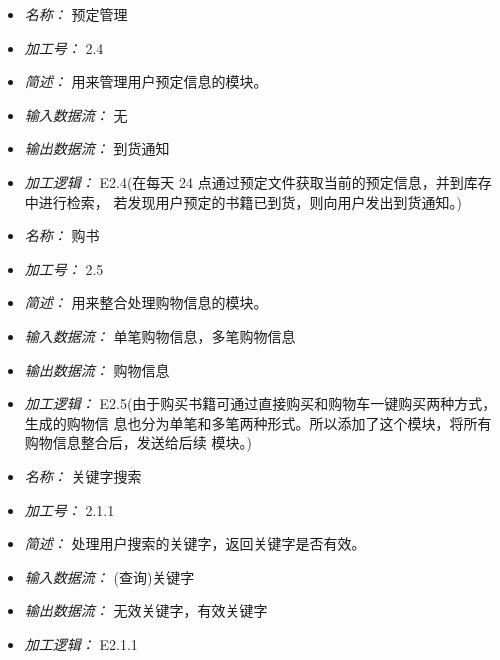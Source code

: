 \vspace{-1mm}


\begin{itemize}
\item \textit{名称： } 预定管理
\item \textit{加工号： }2.4
\item \textit{简述： }用来管理用户预定信息的模块。
\item \textit{输入数据流： }无
\item \textit{输出数据流： }到货通知
\item \textit{加工逻辑： }E2.4(在每天 24 点通过预定文件获取当前的预定信息，并到库存中进行检索， 若发现用户预定的书籍已到货，则向用户发出到货通知。)

\end{itemize}


\vspace{-1mm}


\begin{itemize}
\item \textit{名称： }购书
\item \textit{加工号： }2.5 
\item \textit{简述： }用来整合处理购物信息的模块。 
\item \textit{输入数据流： }单笔购物信息，多笔购物信息
\item \textit{输出数据流： }购物信息 
\item \textit{加工逻辑： }E2.5(由于购买书籍可通过直接购买和购物车一键购买两种方式，生成的购物信 息也分为单笔和多笔两种形式。所以添加了这个模块，将所有购物信息整合后，发送给后续 模块。)

\end{itemize}


\vspace{-1mm}


\begin{itemize}
\item \textit{名称： } 关键字搜索
\item \textit{加工号： }2.1.1 
\item \textit{简述： }处理用户搜索的关键字，返回关键字是否有效。 
\item \textit{输入数据流： }(查询)关键字 
\item \textit{输出数据流： }无效关键字，有效关键字 
\item \textit{加工逻辑： }E2.1.1

\end{itemize}


\vspace{-1mm}


